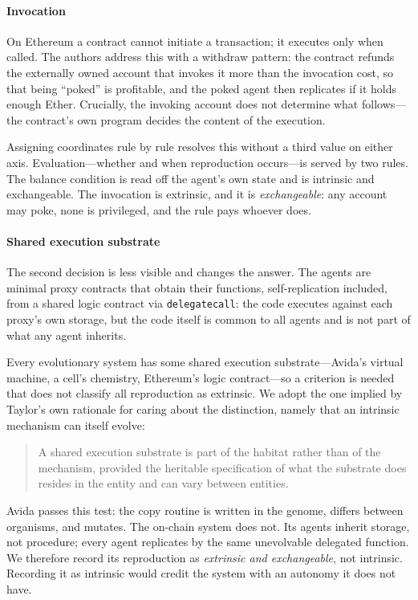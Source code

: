 \documentclass[review,3p,times]{elsarticle}
\begin{document}
\paragraph{Invocation}
On Ethereum a contract cannot initiate a transaction; it executes only when
called. The authors address this with a withdraw pattern: the contract
refunds the externally owned account that invokes it more than the
invocation cost, so that being ``poked'' is profitable, and the poked agent
then replicates if it holds enough Ether. Crucially, the invoking account
does not determine what follows---the contract's own program decides the
content of the execution.

Assigning coordinates rule by rule resolves this without a third value on
either axis. Evaluation---whether and when reproduction occurs---is served
by two rules. The balance condition is read off the agent's own state and
is intrinsic and exchangeable. The invocation is extrinsic, and it is
\emph{exchangeable}: any account may poke, none is privileged, and the rule
pays whoever does.

\paragraph{Shared execution substrate}
The second decision is less visible and changes the answer. The agents are
minimal proxy contracts that obtain their functions, self-replication
included, from a shared logic contract via \texttt{delegatecall}: the code
executes against each proxy's own storage, but the code itself is common to
all agents and is not part of what any agent inherits.

Every evolutionary system has some shared execution substrate---Avida's
virtual machine, a cell's chemistry, Ethereum's logic contract---so a
criterion is needed that does not classify all reproduction as extrinsic.
We adopt the one implied by Taylor's own rationale for caring about the
distinction, namely that an intrinsic mechanism can itself evolve:

\begin{quote}
A shared execution substrate is part of the habitat rather than of the
mechanism, provided the heritable specification of what the substrate does
resides in the entity and can vary between entities.
\end{quote}

Avida passes this test: the copy routine is written in the genome, differs
between organisms, and mutates. The on-chain system does not. Its agents
inherit storage, not procedure; every agent replicates by the same
unevolvable delegated function. We therefore record its reproduction as
\emph{extrinsic and exchangeable}, not intrinsic. Recording it as intrinsic
would credit the system with an autonomy it does not have.
\end{document}
